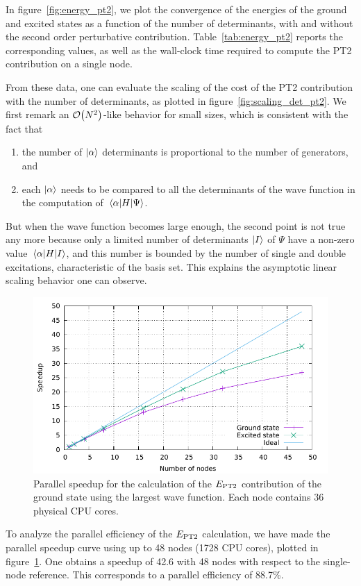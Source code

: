 \documentclass[./thesis.tex]{subfiles}
\begin{document}
In figure~\ref{fig:energy_pt2}, we plot the convergence of the energies of
the ground and excited states as a function of the number of
determinants, with and without the second order perturbative contribution.
Table~\ref{tab:energy_pt2} reports the corresponding values, as well as the
wall-clock time required to compute the PT2 contribution on a single node.

From these data, one can evaluate the scaling of the cost of the PT2 contribution
with the number of determinants, as plotted in figure~\ref{fig:scaling_det_pt2}.
We first remark an $\order{N^2}$-like behavior for small sizes, which is consistent
with the fact that
\begin{enumerate}
\item the number of $\ket{\alpha}$ determinants is proportional to the
number of generators, and 
\item each $\ket{\alpha}$ needs to be compared to all the determinants of the wave function in the computation of $\mel{\alpha}{H}{\Psi}$.
\end{enumerate}
But when the wave function becomes large enough, the second point is not true any more because only a limited number of determinants $\ket{I}$ of $\Psi$ have a non-zero
value $\mel{\alpha}{H}{I}$, and this number is bounded by the number of single and double excitations, characteristic of the basis set. This explains the asymptotic linear scaling behavior one can observe.
\begin{figure}[h]
	\begin{center}
		\includegraphics[width=0.8\columnwidth]{figures/pt2/scaling_node}
		\caption{Parallel speedup for the calculation of the $E_\text{PT2}$ contribution of the ground state using the largest wave function. Each node contains 36 physical CPU cores.}
		\label{fig:scaling_node_pt2}
	\end{center}
\end{figure}

To analyze the parallel efficiency of the $E_\text{PT2}$ calculation, we have made the parallel speedup curve using up to 48 nodes (1728 CPU cores), plotted in figure~\ref{fig:scaling_node_pt2}. One obtains a speedup of 42.6 with 48 nodes with respect to the single-node reference. This corresponds to a parallel efficiency of 88.7\%.
\end{document}
